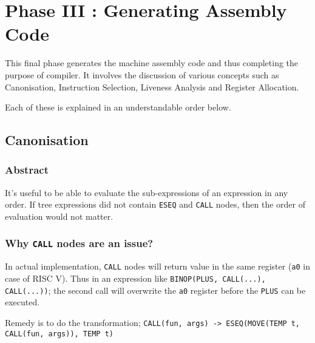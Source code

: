 \chapter{Phase III : Generating Assembly Code}

This final phase generates the machine assembly code and thus completing the purpose of compiler.
It involves the discussion of various concepts such as Canonisation, Instruction Selection, Liveness Analysis and Register Allocation.

Each of these is explained in an understandable order below.

\section{Canonisation}


\hypertarget{abstract}{%
	\subsection{Abstract}\label{abstract}}

It's useful to be able to evaluate the sub-expressions of an expression
in any order. If tree expressions did not contain
\texttt{ESEQ}
and
\texttt{CALL}
nodes, then the order of evaluation would not matter.

\hypertarget{why-call-nodes-are-an-issue}{%
	\subsection{\texorpdfstring{Why
			\texttt{CALL}
			nodes are an
			issue?}{Why  nodes are an issue?}}\label{why-call-nodes-are-an-issue}}

In actual implementation,
\texttt{CALL}
nodes will return value in the same register
(\texttt{a0} in
case of RISC V). Thus in an expression like
\texttt{BINOP(PLUS, CALL(...), CALL(...))};
the second call will overwrite the
\texttt{a0}
register before the
\texttt{PLUS}
can be executed.

Remedy is to do the transformation;
\texttt{CALL(fun, args) -> ESEQ(MOVE(TEMP t, CALL(fun, args)), TEMP t)}

